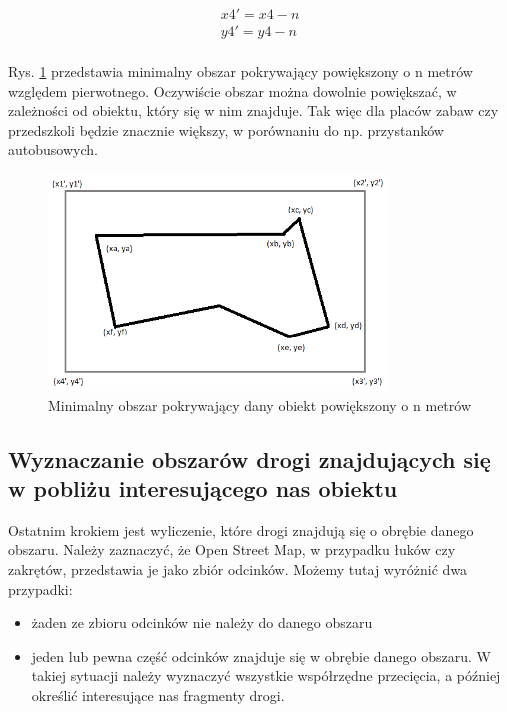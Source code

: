 \begin{equation} \label{sec:powiekszoneWierzcholek}
\begin{split}
x4' = x4 - n \\
y4' = y4 - n \\
\end{split}
\end{equation}

Rys. \ref{sec:thirdBB} przedstawia minimalny obszar pokrywający powiększony o n metrów względem pierwotnego. Oczywiście obszar można dowolnie powiększać, w zależności od obiektu, który się w nim znajduje. Tak więc dla placów zabaw czy przedszkoli będzie znacznie większy, w porównaniu do np. przystanków autobusowych.

\newpage
\begin{figure}[h]
\label{sec:thirdBB}
\caption{Minimalny obszar pokrywający dany obiekt powiększony o n metrów}
\centering
\includegraphics[width=0.8\textwidth]{BoundingBoxExtended}
\end{figure}

\subsection{Wyznaczanie obszarów drogi znajdujących się w pobliżu interesującego nas obiektu}

Ostatnim krokiem jest wyliczenie, które drogi znajdują się o obrębie danego obszaru. Należy zaznaczyć, że Open Street Map, w przypadku łuków czy zakrętów, przedstawia je jako zbiór odcinków. Możemy tutaj wyróżnić dwa przypadki:
\begin{itemize}
\item żaden ze zbioru odcinków nie należy do danego obszaru
\item jeden lub pewna część odcinków znajduje się w obrębie danego obszaru. W takiej sytuacji należy wyznaczyć wszystkie współrzędne przecięcia, a później określić interesujące nas fragmenty drogi.
\end{itemize}


